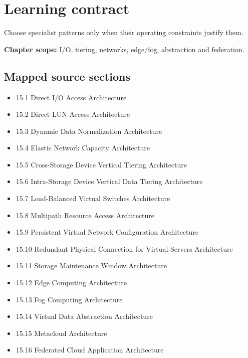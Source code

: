 \documentclass[10pt,letterpaper]{article}
\begin{document}
\sourceStatement
\tableofcontents
\newpage
\section{Learning contract}
\begin{takeaway}
Choose specialist patterns only when their operating constraints justify them.
\end{takeaway}
\textbf{Chapter scope:} I/O, tiering, networks, edge/fog, abstraction and federation.\\
\subsection{Mapped source sections}
\begin{itemize}
\item 15.1 Direct I/O Access Architecture
\item 15.2 Direct LUN Access Architecture
\item 15.3 Dynamic Data Normalization Architecture
\item 15.4 Elastic Network Capacity Architecture
\item 15.5 Cross-Storage Device Vertical Tiering Architecture
\item 15.6 Intra-Storage Device Vertical Data Tiering Architecture
\item 15.7 Load-Balanced Virtual Switches Architecture
\item 15.8 Multipath Resource Access Architecture
\item 15.9 Persistent Virtual Network Configuration Architecture
\item 15.10 Redundant Physical Connection for Virtual Servers Architecture
\item 15.11 Storage Maintenance Window Architecture
\item 15.12 Edge Computing Architecture
\item 15.13 Fog Computing Architecture
\item 15.14 Virtual Data Abstraction Architecture
\item 15.15 Metacloud Architecture
\item 15.16 Federated Cloud Application Architecture
\end{itemize}
\end{document}
